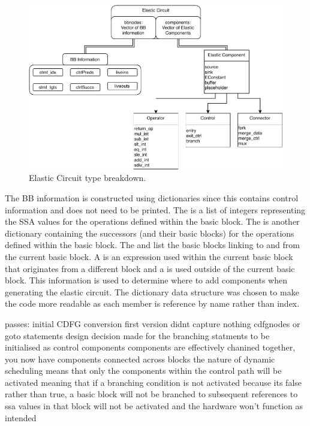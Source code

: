\begin{figure}[htb!]
    \centering
    \includegraphics[width=\textwidth]{Images/ec_types.pdf}
    \caption{Elastic Circuit type breakdown. }
    \label{fig:ec_types}
\end{figure}

The BB information is constructed using dictionaries since this contains control information and does not need to be printed. The  is a list of integers representing the SSA values for the operations defined within the basic block. The  is another dictionary containing the successors (and their basic blocks) for the operations defined within the basic block. The  and  list the basic blocks linking to and from the current basic block.  A  is an expression used within the current basic block that originates from a different block and a  is used outside of the current basic block. This information is used to determine where to add components when generating the elastic circuit. The dictionary data structure was chosen to make the code more readable as each member is reference by name rather than index.

\iffalse
passes:
initial CDFG conversion
	first version didnt capture nothing cdfgnodes or goto statements
	design decision made for the branching statments to be initialised as control components
	components are effectively chanined together, you now have components connected across blocks
	the nature of dynamic scheduling means that only the components within the control path will be activated
	meaning that if a branching condition is not activated because its false rather than true, a basic block will not be branched to
	subsequent references to ssa values in that block will not be activated and the hardware won't function as intended

